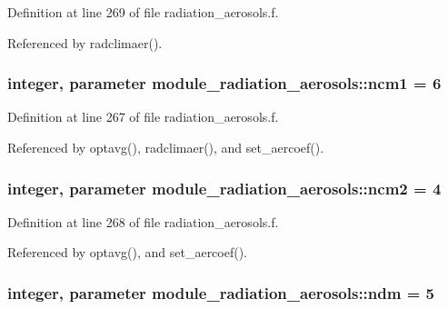 Definition at line 269 of file radiation\+\_\+aerosols.\+f.



Referenced by radclimaer().

\subsubsection[{\texorpdfstring{ncm1}{ncm1}}]{\setlength{\rightskip}{0pt plus 5cm}integer, parameter module\+\_\+radiation\+\_\+aerosols\+::ncm1 = 6\hspace{0.3cm}{\ttfamily [private]}}\hypertarget{group__module__radiation__aerosols_gac6bc533a79d4b19129834cbc9a9fbc18}{}\label{group__module__radiation__aerosols_gac6bc533a79d4b19129834cbc9a9fbc18}


Definition at line 267 of file radiation\+\_\+aerosols.\+f.



Referenced by optavg(), radclimaer(), and set\+\_\+aercoef().

\subsubsection[{\texorpdfstring{ncm2}{ncm2}}]{\setlength{\rightskip}{0pt plus 5cm}integer, parameter module\+\_\+radiation\+\_\+aerosols\+::ncm2 = 4\hspace{0.3cm}{\ttfamily [private]}}\hypertarget{group__module__radiation__aerosols_ga61dbcce5b0bb02dd31d4a37983887a7b}{}\label{group__module__radiation__aerosols_ga61dbcce5b0bb02dd31d4a37983887a7b}


Definition at line 268 of file radiation\+\_\+aerosols.\+f.



Referenced by optavg(), and set\+\_\+aercoef().

\subsubsection[{\texorpdfstring{ndm}{ndm}}]{\setlength{\rightskip}{0pt plus 5cm}integer, parameter module\+\_\+radiation\+\_\+aerosols\+::ndm = 5\hspace{0.3cm}{\ttfamily [private]}}\hypertarget{group__module__radiation__aerosols_gae77b22f76f193cef19b6e6c3ee8e0773}{}\label{group__module__radiation__aerosols_gae77b22f76f193cef19b6e6c3ee8e0773}


